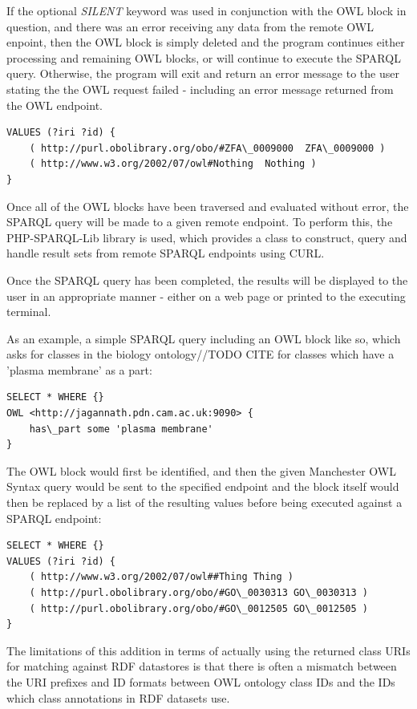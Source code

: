 \documentclass{article}
\begin{document}
If the optional \emph{SILENT} keyword was used in conjunction with the OWL block
in question, and there was an error receiving any data from the remote OWL
enpoint, then the OWL block is simply deleted and the program continues either
processing and remaining OWL blocks, or will continue to execute the SPARQL
query. Otherwise, the program will exit and return an error message to the user stating
the the OWL request failed - including an error message returned from the OWL endpoint.

\begin{lstlisting}
VALUES (?iri ?id) { 
    ( http://purl.obolibrary.org/obo/#ZFA\_0009000  ZFA\_0009000 ) 
    ( http://www.w3.org/2002/07/owl#Nothing  Nothing )
}
\end{lstlisting}

Once all of the OWL blocks have been traversed and evaluated without error, the
SPARQL query will be made to a given remote endpoint. To perform this, the 
PHP-SPARQL-Lib library\cite{phpsparqllib} is used, which provides a class to 
construct, query and handle result sets from remote SPARQL endpoints using CURL.

Once the SPARQL query has been completed, the results will be displayed to the
user in an appropriate manner - either on a web page or printed to the executing
terminal.

As an example, a simple SPARQL query including an OWL block like so, which asks
for classes in the biology ontology//TODO CITE for classes which have a 'plasma
membrane' as a part:

\begin{lstlisting}
SELECT * WHERE {}
OWL <http://jagannath.pdn.cam.ac.uk:9090> {
    has\_part some 'plasma membrane'
}
\end{lstlisting}

The OWL block would first be identified, and then the given Manchester OWL
Syntax query would be sent to the specified endpoint and the block itself would
then be replaced by a list of the resulting values before being executed against
a SPARQL endpoint:

\begin{lstlisting}
SELECT * WHERE {} 
VALUES (?iri ?id) { 
    ( http://www.w3.org/2002/07/owl##Thing Thing ) 
    ( http://purl.obolibrary.org/obo/#GO\_0030313 GO\_0030313 ) 
    ( http://purl.obolibrary.org/obo/#GO\_0012505 GO\_0012505 ) 
}
\end{lstlisting}

The limitations of this addition in terms of actually using the returned class
URIs for matching against RDF datastores is that there is often a mismatch
between the URI prefixes and ID formats between OWL ontology class IDs and the
IDs which class annotations in RDF datasets use.
\end{document}

